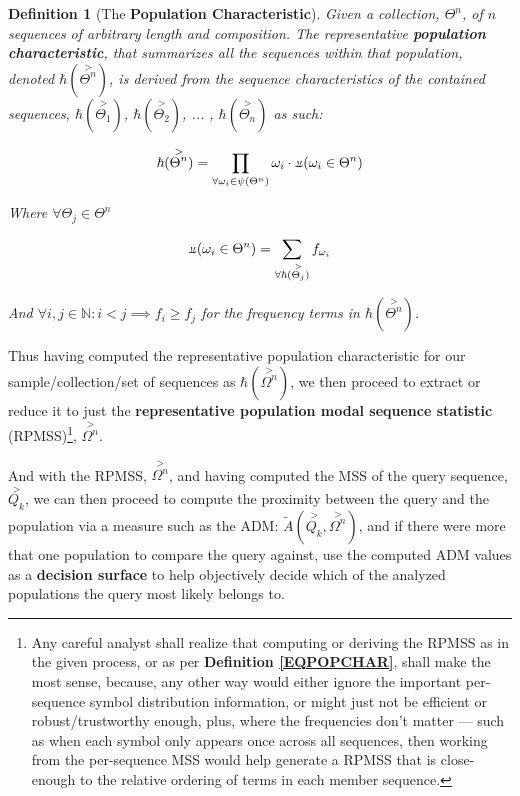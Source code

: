 \documentclass[a4paper, 18pt]{book} %
\newtheorem{defn}{Definition}
\newcommand{\invpi}{\rotatebox[origin=c]{180}{$\pi$}}
\begin{document}
\begin{defn}[The \textbf{Population Characteristic}]
\label{DEFPOPCHAR}
Given a collection, $\Theta^n$, of $n$ sequences of arbitrary length and composition. The representative \textbf{population characteristic}, that summarizes all the sequences within that population, denoted $\hbar(\overset{>}{\Theta^n})$, is derived from the sequence characteristics of the contained sequences, $\hbar(\overset{>}{\Theta_1})$, $\hbar(\overset{>}{\Theta_2})$, ... , $\hbar(\overset{>}{\Theta_n})$ as such:

\begin{equation}
\label{EQPOPCHAR}
\hbar(\overset{>}{\Theta^n}) = \prod\limits_{\forall \omega_i \in \psi(\Theta^n)} \omega_i \cdot \invpi(\omega_i \in \Theta^n)
\end{equation}

Where $\forall \Theta_j \in \Theta^n$

\begin{equation}
\invpi(\omega_i \in \Theta^n) = \sum\limits_{\forall \hbar(\overset{>}{\Theta_j})} f_{\omega_i}
\end{equation}

And $\forall i, j \in \mathbb{N}: i < j \implies f_i \geq f_j$ for the frequency terms in $\hbar(\overset{>}{\Theta^n})$.
\end{defn}


Thus having computed the representative population characteristic for our sample/collection/set of sequences as $\hbar(\overset{>}{\Omega^n})$, we then proceed to extract or reduce it to just the \textbf{representative population modal sequence statistic} (RPMSS)\footnote{Any careful analyst shall realize that computing or deriving the RPMSS as in the given process, or as per \textbf{Definition \ref{EQPOPCHAR}}, shall make the most sense, because, any other way would either ignore the important per-sequence symbol distribution information, or might just not be efficient or robust/trustworthy enough, plus, where the frequencies don't matter --- such as when each symbol only appears once across all sequences, then working from the per-sequence MSS would help generate a RPMSS that is close-enough to the relative ordering of terms in each member sequence.}, $\overset{>}{\Omega^n}$.

And with the RPMSS, $\overset{>}{\Omega^n}$, and having computed the MSS of the query sequence, $\overset{>}{Q_k}$, we can then proceed to compute the proximity between the query and the population via a measure such as the ADM: $\tilde{A}(\overset{>}{Q_k},\overset{>}{\Omega^n})$, and if there were more that one population to compare the query against, use the computed ADM values as a \textbf{decision surface} to help objectively decide which of the analyzed populations the query most likely belongs to.
\end{document}

